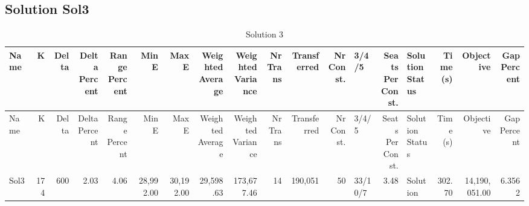 \documentclass[a4paper]{article}
\begin{document}
\clearpage
\subsection{Solution Sol3}

{\scriptsize
\begin{longtable}{lrrrrrrrrrrrlrlrrr}
\caption{Solution 3}
\\ \toprule
Name &K &Delta &\shortstack{Delta\\Percent} &\shortstack{Range\\Percent} &Min E &Max E &\shortstack{Weighted\\Average} &\shortstack{Weighted\\Variance} &\shortstack{Nr\\Trans} &Transferred &\shortstack{Nr\\Const.} &3/4/5 &\shortstack{Seats\\Per\\Const.} &\shortstack{Solution\\Status} &\shortstack{Time\\(s)} &Objective &\shortstack{Gap\\Percent} \\ \midrule
\endfirsthead
\toprule
Name &K &Delta &\shortstack{Delta\\Percent} &\shortstack{Range\\Percent} &Min E &Max E &\shortstack{Weighted\\Average} &\shortstack{Weighted\\Variance} &\shortstack{Nr\\Trans} &Transferred &\shortstack{Nr\\Const.} &3/4/5 &\shortstack{Seats\\Per\\Const.} &\shortstack{Solution\\Status} &\shortstack{Time\\(s)} &Objective &\shortstack{Gap\\Percent} \\ \midrule
\endhead
\bottomrule
\endfoot
Sol3&174&600& 2.03& 4.06&28,992.00&30,192.00&29,598.63&173,677.46&14&190,051&50&33/10/7& 3.48&Solution&302.70&14,190,051.00&6.3562\\ 
\end{longtable}

}
\end{document}
